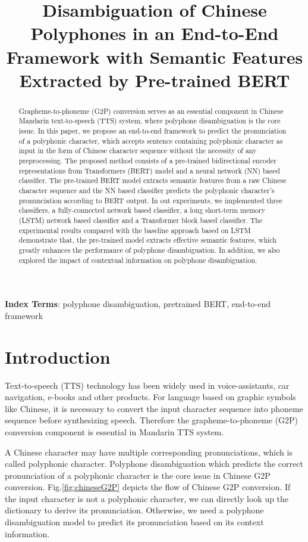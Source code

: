 \documentclass[a4paper]{article}
\title{Disambiguation of Chinese Polyphones in an End-to-End Framework with Semantic Features Extracted by Pre-trained BERT}
\begin{document}
\maketitle
% 
\begin{abstract}
Grapheme-to-phoneme (G2P) conversion serves as an essential component in Chinese Mandarin text-to-speech (TTS) system, where polyphone disambiguation is the core issue. In this paper, we propose an end-to-end framework to predict the pronunciation of a polyphonic character, which accepts sentence containing polyphonic character as input in the form of Chinese character sequence without the necessity of any preprocessing. The proposed method consists of a pre-trained bidirectional encoder representations from Transformers (BERT) model and a neural network (NN) based classifier. The pre-trained BERT model extracts semantic features from a raw Chinese character sequence and the NN based classifier predicts the polyphonic character's pronunciation according to BERT output. In out experiments, we implemented three classifiers, a fully-connected network based classifier, a long short-term memory (LSTM) network based classifier and a Transformer block based classifier. The experimental results compared with the baseline approach based on LSTM demonstrate that, the pre-trained model extracts effective semantic features, which greatly enhances the performance of polyphone disambiguation. In addition, we also explored the impact of contextual information on polyphone disambiguation.
\end{abstract}

\noindent\textbf{Index Terms}: polyphone disambiguation, pretrained BERT, end-to-end framework

\section{Introduction}


Text-to-speech (TTS) technology has been widely used in voice-assistants, car navigation, e-books and other products. For language based on graphic symbols like Chinese, it is necessary to convert the input character sequence into phoneme sequence before synthesizing speech. Therefore the grapheme-to-phoneme (G2P) conversion component is essential in Mandarin TTS system. 


A Chinese character may have multiple corresponding pronunciations, which is called polyphonic character. Polyphone disambiguation which predicts the correct pronunciation of a polyphonic character is the core issue in Chinese G2P conversion. Fig.\ref{fig:chineseG2P} depicts the flow of Chinese G2P conversion. If the input character is not a polyphonic character, we can directly look up the dictionary to derive its pronunciation. Otherwise, we need a polyphone disambiguation model to predict its pronunciation based on its context information.
\end{document}
